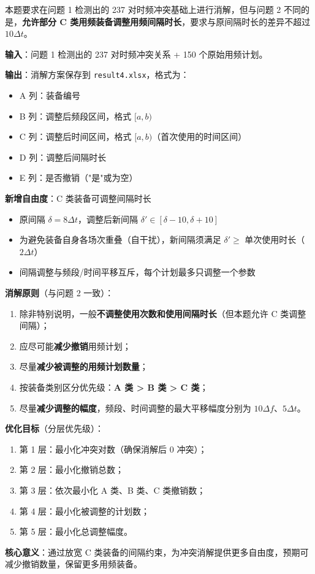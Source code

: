 
本题要求在问题 1 检测出的 237 对时频冲突基础上进行消解，但与问题 2 不同的是，\textbf{允许部分 C 类用频装备调整用频间隔时长}，要求与原间隔时长的差异不超过 $10\Delta t$。

\textbf{输入}：问题 1 检测出的 237 对时频冲突关系 + 150 个原始用频计划。

\textbf{输出}：消解方案保存到 \texttt{result4.xlsx}，格式为：
\begin{itemize}
    \item A 列：装备编号
    \item B 列：调整后频段区间，格式 $[a, b)$
    \item C 列：调整后时间区间，格式 $[a, b)$（首次使用的时间区间）
    \item D 列：调整后间隔时长
    \item E 列：是否撤销（"是"或为空）
\end{itemize}

\textbf{新增自由度}：C 类装备可调整间隔时长
\begin{itemize}
    \item 原间隔 $\delta = 8\Delta t$，调整后新间隔 $\delta' \in [\delta - 10, \delta + 10]$
    \item 为避免装备自身各场次重叠（自干扰），新间隔须满足 $\delta' \geq$ 单次使用时长（$2\Delta t$）
    \item 间隔调整与频段/时间平移互斥，每个计划最多只调整一个参数
\end{itemize}

\textbf{消解原则}（与问题 2 一致）：
\begin{enumerate}
    \item 除非特别说明，一般\textbf{不调整使用次数和使用间隔时长}（但本题允许 C 类调整间隔）；
    \item 应尽可能\textbf{减少撤销}用频计划；
    \item 尽量\textbf{减少被调整的用频计划数量}；
    \item 按装备类别区分优先级：\textbf{A 类 > B 类 > C 类}；
    \item 尽量\textbf{减少调整的幅度}，频段、时间调整的最大平移幅度分别为 $10\Delta f$、$5\Delta t$。
\end{enumerate}

\textbf{优化目标}（分层优先级）：
\begin{enumerate}
    \item 第 1 层：最小化冲突对数（确保消解后 0 冲突）；
    \item 第 2 层：最小化撤销总数；
    \item 第 3 层：依次最小化 A 类、B 类、C 类撤销数；
    \item 第 4 层：最小化被调整的计划数；
    \item 第 5 层：最小化总调整幅度。
\end{enumerate}

\textbf{核心意义}：通过放宽 C 类装备的间隔约束，为冲突消解提供更多自由度，预期可减少撤销数量，保留更多用频装备。
